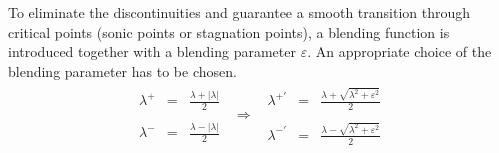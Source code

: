 \documentclass[11pt, a4paper]{article}
\begin{document}
To eliminate the discontinuities and guarantee a smooth transition through critical points (sonic points or stagnation points), a blending function is introduced together with a blending parameter $\varepsilon$. An appropriate choice of the blending parameter has to be chosen.
\begin{equation}
    \begin{matrix}
        \begin{array}{lcl}
            \lambda^+ & = & \displaystyle\frac{\lambda+\left|\lambda\right|}{2} \\\\
            \lambda^- & = & \displaystyle\frac{\lambda-\left|\lambda\right|}{2}
        \end{array} & \Rightarrow & \begin{array}{lcl}
            \lambda^{+'} & = & \displaystyle\frac{\lambda+\sqrt{\lambda^2+\varepsilon^2}}{2} \\\\
            \lambda^{-'} & = & \displaystyle\frac{\lambda-\sqrt{\lambda^2+\varepsilon^2}}{2}
        \end{array}
    \end{matrix}
\end{equation}
\end{document}
